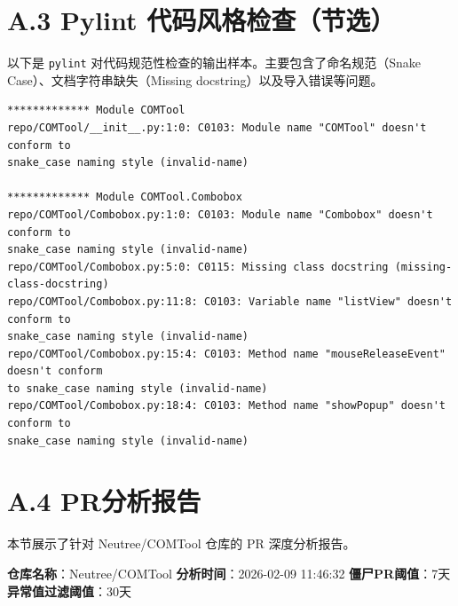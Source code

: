 \section*{A.3 Pylint 代码风格检查（节选）}

以下是 \texttt{pylint} 对代码规范性检查的输出样本。主要包含了命名规范（Snake Case）、文档字符串缺失（Missing docstring）以及导入错误等问题。

\begin{verbatim}
************* Module COMTool
repo/COMTool/__init__.py:1:0: C0103: Module name "COMTool" doesn't conform to 
snake_case naming style (invalid-name)

************* Module COMTool.Combobox
repo/COMTool/Combobox.py:1:0: C0103: Module name "Combobox" doesn't conform to 
snake_case naming style (invalid-name)
repo/COMTool/Combobox.py:5:0: C0115: Missing class docstring (missing-class-docstring)
repo/COMTool/Combobox.py:11:8: C0103: Variable name "listView" doesn't conform to 
snake_case naming style (invalid-name)
repo/COMTool/Combobox.py:15:4: C0103: Method name "mouseReleaseEvent" doesn't conform 
to snake_case naming style (invalid-name)
repo/COMTool/Combobox.py:18:4: C0103: Method name "showPopup" doesn't conform to 
snake_case naming style (invalid-name)
\end{verbatim}

\section*{A.4 PR分析报告}

本节展示了针对 Neutree/COMTool 仓库的 PR 深度分析报告。

\textbf{仓库名称}：Neutree/COMTool \quad
\textbf{分析时间}：2026-02-09 11:46:32 \quad
\textbf{僵尸PR阈值}：7天 \quad
\textbf{异常值过滤阈值}：30天

